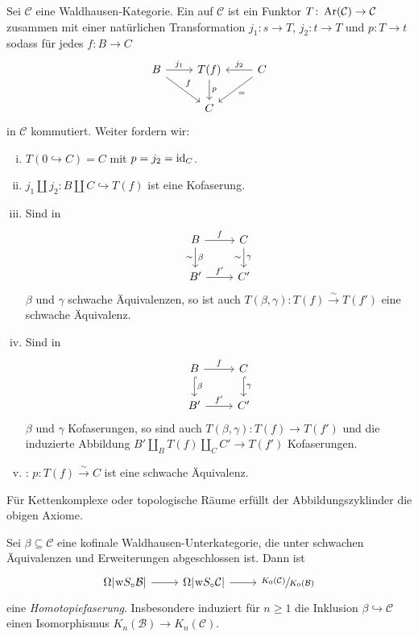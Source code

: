 \begin{definition}
	Sei $\mathcal{C}$ eine Waldhausen-Kategorie.
	Ein  auf $\mathcal{C}$ ist ein Funktor $T \colon \operatorname{Ar}(\mathcal{C}) \to \mathcal{C}$ zusammen mit einer natürlichen Transformation $j_1 \colon s \to T$,
	$j_2 \colon t \to T$ und $p \colon T \to t$ sodass für jedes $f \colon B \to C$
	\[
		\begin{tikzcd}
			B \drar["f"] \rar["j_1"] & T(f)  \dar["p"] & C \lar["j_2"'] \dlar["="]   \\
			& C
		\end{tikzcd}
	\]
	in $\mathcal{C}$ kommutiert.
	Weiter fordern wir:
	\begin{enumerate}[(i)]
		\item $T(0 \hookrightarrow C) = C$ mit $p = j_2 = \operatorname{id}_C$.
		\item $j_1 \amalg j_2 \colon B \amalg C \hookrightarrow T(f)$ ist eine Kofaserung.
		\item Sind in 
		\[
			\begin{tikzcd}
				B \rar["f"]  \dar["\beta","\sim"'] & C \dar["\gamma","\sim"'] \\
				B' \rar["f'"] & C'
			\end{tikzcd}
		\]
		$\beta$ und $\gamma$ schwache Äquivalenzen, so ist auch $T(\beta,\gamma) \colon T(f) \xrightarrow{\sim} T(f')$ eine schwache Äquivalenz.
		\item Sind in 
		\[
			\begin{tikzcd}
				B \rar["f"]  \dar["\beta",hook] & C \dar["\gamma",hook] \\
				B' \rar["f'"] & C'
			\end{tikzcd}
		\]
		$\beta$ und $\gamma$ Kofaserungen, so sind auch $T(\beta,\gamma) \colon T(f) \to T(f')$ und die induzierte Abbildung $B' \amalg_B T(f) \amalg_C C' \to T(f')$ Kofaserungen.
		\item {}: $p \colon T(f) \xrightarrow{\sim} C$ ist eine schwache Äquivalenz.
	\end{enumerate}
\end{definition}

\begin{beispiel}
	Für Kettenkomplexe oder topologische Räume erfüllt der Abbildungszyklinder die obigen Axiome.
\end{beispiel}

\begin{satz}[{name={Kofinalitätssatz}}]
	Sei $\beta \subseteq \mathcal{C}$ eine kofinale Waldhausen-Unterkategorie, die unter schwachen Äquivalenzen und Erweiterungen abgeschlossen ist.
	Dann ist
	\[
		\begin{tikzcd}
			\Omega \abs*{\w S_\circ \mathcal{B}} \rar & \Omega \abs*{\w S_\circ \mathcal{C}} \rar & \sfrac{K_0(\mathcal{C})}{K_0(\mathcal{B})}
		\end{tikzcd}
	\]
	eine \emph{Homotopiefaserung}.
	Insbesondere induziert für $n \ge 1$ die Inklusion $\beta \hookrightarrow \mathcal{C}$ einen Isomorphismus $K_n(\mathcal{B}) \to K_n(\mathcal{C})$.
\end{satz}

